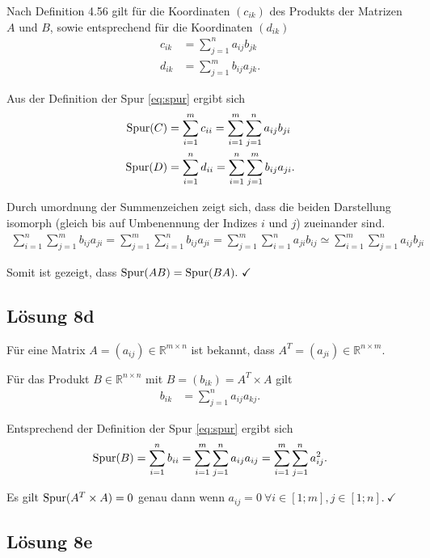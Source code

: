 \documentclass[main.tex]{subfiles}
\begin{document}
Nach Definition 4.56 gilt für die Koordinaten $(c_{ik})$ des Produkts der Matrizen $A$ und $B$,
sowie entsprechend für die Koordinaten $(d_{ik})$
\begin{align*}
    c_{ik} &= \sum_{j=1}^{n} a_{ij} b_{jk}\\
    d_{ik} &= \sum_{j=1}^{m} b_{ij} a_{jk}.
\end{align*}

Aus der Definition der Spur \ref{eq:spur} ergibt sich
\begin{align*}
    \operatorname{Spur} (C) &= \sum_{i=1}^{m} c_{ii} = \sum_{i=1}^{m} \sum_{j=1}^{n} a_{ij} b_{ji}\\
    \operatorname{Spur} (D) &= \sum_{i=1}^{n} d_{ii} = \sum_{i=1}^{n} \sum_{j=1}^{m} b_{ij} a_{ji}.
\end{align*}

Durch umordnung der Summenzeichen zeigt sich, dass die beiden Darstellung isomorph (gleich bis auf Umbenennung der Indizes $i$ und $j$) zueinander sind.
\begin{align*}
    \sum_{i=1}^{n} \sum_{j=1}^{m} b_{ij} a_{ji} = \sum_{j=1}^{m} \sum_{i=1}^{n} b_{ij} a_{ji} = \sum_{j=1}^{m} \sum_{i=1}^{n} a_{ji} b_{ij} \simeq \sum_{i=1}^{m} \sum_{j=1}^{n} a_{ij} b_{ji}
\end{align*}

Somit ist gezeigt, dass $\operatorname{Spur} (AB) = \operatorname{Spur} (BA). \ \checkmark$

\subsection*{Lösung 8d}
Für eine Matrix $A = (a_{ij}) \in \mathbb{R}^{m\times n}$ ist bekannt, dass $A^T = (a_{ji}) \in \mathbb{R}^{n\times m}$.

Für das Produkt $B \in \mathbb{R}^{n\times n}$ mit $B = (b_{ik}) = A^T \times A$ gilt
\begin{align*}
    b_{ik} &= \sum_{j=1}^{n} a_{ij} a_{kj}.
\end{align*}

Entsprechend der Definition der Spur \ref{eq:spur} ergibt sich
\begin{align*}
    \operatorname{Spur} (B) = \sum_{i=1}^{n} b_{ii}
    = \sum_{i=1}^{m} \sum_{j=1}^{n} a_{ij} a_{ij}
    = \sum_{i=1}^{m} \sum_{j=1}^{n} a_{ij}^2.
\end{align*}

Es gilt $\operatorname{Spur} (A^T \times A) = 0$ genau dann wenn $a_{ij} = 0\ \forall i\in [1;m], j\in [1;n].\ \checkmark$

\subsection*{Lösung 8e}
\end{document}
